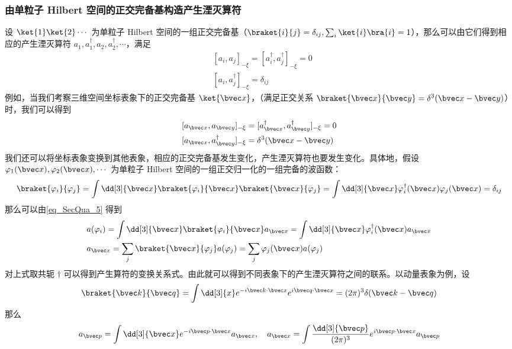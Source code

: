 \subsubsection{由单粒子 Hilbert 空间的正交完备基构造产生湮灭算符}
设 $\ket{1}\ket{2}\cdots$ 为单粒子 Hilbert 空间的一组正交完备基（$\braket{i}{j}=\delta_{ij},\sum_i\ket{i}\bra{i}=1$），那么可以由它们得到相应的产生湮灭算符 $a_1,a^\dagger_1,a_2,a^\dagger_2,\cdots$，满足
\begin{equation}
\begin{aligned}
&[a_i,a_j]_{-\xi}=[a_i^\dagger,a_j^\dagger]_{-\xi}=0\\
&[a_i,a_j^\dagger]_{-\xi}=\delta_{ij}
\end{aligned}
\end{equation}
例如，当我们考察三维空间坐标表象下的正交完备基 $\ket{\bvec x}$，（满足正交关系 $\braket{\bvec x}{\bvec y}=\delta^3(\bvec x-\bvec y)$）时，我们可以得到
\begin{equation}
\begin{aligned}
&[a_{\bvec x},a_{\bvec y}]_{-\xi}=[a_{\bvec x}^\dagger,a_{\bvec y}^\dagger]_{-\xi}=0\\
&[a_{\bvec x},a_{\bvec y}^\dagger]_{-\xi}=\delta^3(\bvec x-\bvec y)
\end{aligned}
\end{equation}
我们还可以将坐标表象变换到其他表象，相应的正交完备基发生变化，产生湮灭算符也要发生变化。具体地，假设 $\varphi_1(\bvec x),\varphi_2(\bvec x),\cdots$ 为单粒子 Hilbert 空间的一组正交归一化的一组完备的波函数：
\begin{equation}
\braket{\varphi_i}{\varphi_j}=\int \dd[3]{\bvec x}\braket{\varphi_i}{\bvec x}\braket{\bvec x}{\varphi_j}=\int \dd[3]{\bvec x} \varphi_i^\dagger(\bvec x)\varphi_j(\bvec x) =\delta_{ij} 
\end{equation}
那么可以由\autoref{eq_SecQua_5} 得到
\begin{equation}\label{eq_SecQua_8}
\begin{aligned}
&a(\varphi_i) = \int \dd[3]{\bvec x} \braket{\varphi_i}{\bvec x} a_{\bvec x}=\int \dd[3]{\bvec x} \varphi_i^\dagger(\bvec x) a_{\bvec x}\\
&a_{\bvec x} = \sum_j \braket{\bvec x}{\varphi_j} a(\varphi_j) = \sum_j \varphi_j(\bvec x)a(\varphi_j)
\end{aligned}
\end{equation}
对上式取共轭 $\dagger$ 可以得到产生算符的变换关系式。由此就可以得到不同表象下的产生湮灭算符之间的联系。以动量表象为例，设
\begin{equation}
\braket{\bvec k}{\bvec q}=\int \dd[3]{x} e^{-i\bvec k\cdot \bvec x} e^{i\bvec q\cdot \bvec x} = (2\pi)^3 \delta(\bvec k-\bvec q)
\end{equation}
那么
\begin{equation}
a_{\bvec p}=\int \dd[3]{\bvec x} e^{-i\bvec p\cdot \bvec x} a_{\bvec x},\quad a_{\bvec x}=\int \frac{\dd[3]{\bvec p}}{(2\pi)^3}e^{i\bvec p\cdot \bvec x}a_{\bvec p}
\end{equation}

